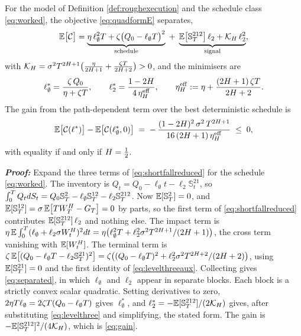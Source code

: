 \begin{proposition}\label{prop:optimalschedule}
For the model of Definition \ref{def:roughexecution} and the schedule class \eqref{eq:worked}, the
objective \eqref{eq:quadformE} separates,
\begin{equation}\label{eq:separated}
  \mathbb{E}\bigl[\mathcal{C}\bigr]
  =\underbrace{\eta\,\ell_\emptyset^{2}T+\zeta\bigl(Q_0-\ell_\emptyset T\bigr)^{2}}_{\text{schedule}}
  \;+\;\underbrace{\mathbb{E}\bigl[\mathbb{S}^{212}_T\bigr]\,\ell_2+\mathcal{K}_{H}\,\ell_2^{2}}_{\text{signal}},
\end{equation}
with
$\mathcal{K}_{H}=\sigma^{2}T^{2H+1}\bigl(\tfrac{\eta}{2H+1}+\tfrac{\zeta T}{2H+2}\bigr)>0$,
and the minimisers are
\begin{equation}\label{eq:optimalpair}
  \ell_\emptyset^{*}=\frac{\zeta\,Q_0}{\eta+\zeta T},
  \qquad
  \ell_2^{*}=\frac{1-2H}{4\,\eta^{\mathrm{eff}}_{H}},
  \qquad
  \eta^{\mathrm{eff}}_{H}:=\eta+\frac{(2H+1)\,\zeta T}{2H+2}.
\end{equation}
The gain from the path-dependent term over the best deterministic schedule is
\begin{equation}\label{eq:gain}
  \mathbb{E}\bigl[\mathcal{C}(\ell^{*})\bigr]-\mathbb{E}\bigl[\mathcal{C}(\ell_\emptyset^{*},0)\bigr]
  \;=\;-\,\frac{(1-2H)^{2}\,\sigma^{2}\,T^{2H+1}}{16\,(2H+1)\,\eta^{\mathrm{eff}}_{H}}\;\leq\;0,
\end{equation}
with equality if and only if $H=\tfrac12$.
\end{proposition}

\textbf{\textit{Proof:}} Expand the three terms of \eqref{eq:shortfallreduced} for the schedule
\eqref{eq:worked}. The inventory is $Q_t=Q_0-\ell_\emptyset t-\ell_2\mathbb{S}^{21}_t$, so
$\int_0^{T}Q_tdS_t=Q_0\mathbb{S}^{2}_T-\ell_\emptyset\mathbb{S}^{12}_T-\ell_2\mathbb{S}^{212}_T$. Now
$\mathbb{E}[\mathbb{S}^{2}_T]=0$, and $\mathbb{E}[\mathbb{S}^{12}_T]=\sigma\,\mathbb{E}\bigl[TW^{H}_T-G_T\bigr]=0$
by parts, so the first term of \eqref{eq:shortfallreduced} contributes
$\mathbb{E}[\mathbb{S}^{212}_T]\,\ell_2$ and nothing else. The impact term is
$\eta\,\mathbb{E}\int_0^{T}(\ell_\emptyset+\ell_2\sigma W^{H}_t)^{2}d t
=\eta\bigl(\ell_\emptyset^{2}T+\ell_2^{2}\sigma^{2}T^{2H+1}/(2H+1)\bigr)$, the cross
term vanishing with $\mathbb{E}[W^{H}_t]$. The terminal term is
$\zeta\,\mathbb{E}\bigl[(Q_0-\ell_\emptyset T-\ell_2\mathbb{S}^{21}_T)^{2}\bigr]
=\zeta\bigl((Q_0-\ell_\emptyset T)^{2}+\ell_2^{2}\sigma^{2}T^{2H+2}/(2H+2)\bigr)$,
using $\mathbb{E}[\mathbb{S}^{21}_T]=0$ and the first identity of \eqref{eq:levelthreeaux}. Collecting gives
\eqref{eq:separated}, in which $\ell_\emptyset$ and $\ell_2$ appear in separate blocks. Each block is
a strictly convex scalar quadratic. Setting derivatives to zero,
$2\eta T\ell_\emptyset=2\zeta T(Q_0-\ell_\emptyset T)$ gives $\ell_\emptyset^{*}$, and
$\ell_2^{*}=-\mathbb{E}[\mathbb{S}^{212}_T]/(2\mathcal{K}_{H})$ gives, after substituting
\eqref{eq:levelthree} and simplifying, the stated form. The gain is
$-\mathbb{E}[\mathbb{S}^{212}_T]^{2}/(4\mathcal{K}_{H})$, which is \eqref{eq:gain}. \qedfilledtext


